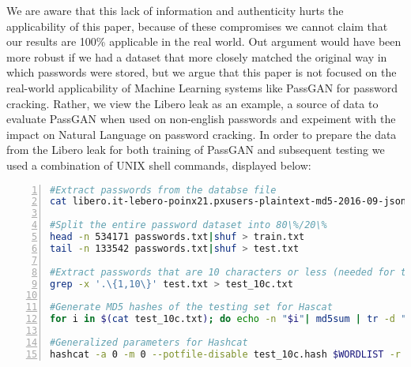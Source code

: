 We are aware that this lack of information and authenticity hurts the applicability of this paper, because of these compromises we cannot claim that our results are 100\% applicable in the real world. Out argument would have been more robust if we had a dataset that more closely matched the original way in which passwords were stored, but we argue that this paper is not focused on the real-world applicability of Machine Learning systems like PassGAN for password cracking. 
Rather, we view the Libero leak as an example, a source of data to evaluate PassGAN when used on non-english passwords and expeiment with the impact on Natural Language on password cracking.
\newpage
In order to prepare the data from the Libero leak for both training of PassGAN and subsequent testing we used a combination of UNIX shell commands, displayed below:

\begin{lstlisting}[language=bash,numbers=left,stepnumber=1,breaklines=true,postbreak=\mbox{\textcolor{red}{$\hookrightarrow$}\space}]
#Extract passwords from the databse file
cat libero.it-lebero-poinx21.pxusers-plaintext-md5-2016-09-json-900k-users-extremely-private.txt|grep clearPassword |cut -d ":" -f 2 | awk '{gsub ("\"","");gsub(",","");print \$1}' > passwords.txt

#Split the entire password dataset into 80\%/20\%
head -n 534171 passwords.txt|shuf > train.txt
tail -n 133542 passwords.txt|shuf > test.txt

#Extract passwords that are 10 characters or less (needed for testing)
grep -x '.\{1,10\}' test.txt > test_10c.txt

#Generate MD5 hashes of the testing set for Hascat
for i in $(cat test_10c.txt); do echo -n "$i"| md5sum | tr -d " -" >> attempt2/test_10c.hash; done

#Generalized parameters for Hashcat
hashcat -a 0 -m 0 --potfile-disable test_10c.hash $WORDLIST -r $RULESET -o out.txt
\end{lstlisting}

